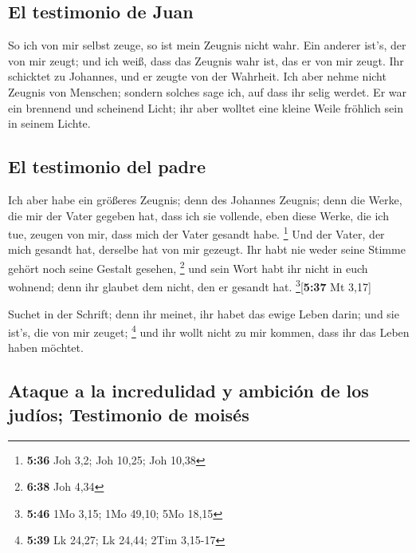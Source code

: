 \hypertarget{el-testimonio-de-juan}{%
\subsection{El testimonio de Juan}\label{el-testimonio-de-juan}}

 So ich von mir selbst zeuge, so ist mein Zeugnis nicht
wahr.  Ein anderer ist's, der von mir zeugt; und ich
weiß, dass das Zeugnis wahr ist, das er von mir zeugt. 
Ihr schicktet zu Johannes, und er zeugte von der Wahrheit.
 Ich aber nehme nicht Zeugnis von Menschen; sondern
solches sage ich, auf dass ihr selig werdet.  Er war ein
brennend und scheinend Licht; ihr aber wolltet eine kleine Weile
fröhlich sein in seinem Lichte.

\hypertarget{el-testimonio-del-padre}{%
\subsection{El testimonio del padre}\label{el-testimonio-del-padre}}

 Ich aber habe ein größeres Zeugnis; denn des Johannes
Zeugnis; denn die Werke, die mir der Vater gegeben hat, dass ich sie
vollende, eben diese Werke, die ich tue, zeugen von mir, dass mich der
Vater gesandt habe. \footnote{\textbf{5:36} Joh 3,2; Joh 10,25; Joh
  10,38}  Und der Vater, der mich gesandt hat, derselbe
hat von mir gezeugt. Ihr habt nie weder seine Stimme gehört noch seine
Gestalt gesehen, \footnote{\textbf{6:38} Joh 4,34}  und
sein Wort habt ihr nicht in euch wohnend; denn ihr glaubet dem nicht,
den er gesandt hat. \footnote{\textbf{5:46} 1Mo 3,15; 1Mo 49,10; 5Mo
  18,15}{[}\textbf{5:37} Mt 3,17{]}

 Suchet in der Schrift; denn ihr meinet, ihr habet das
ewige Leben darin; und sie ist's, die von mir zeuget; \footnote{\textbf{5:39}
  Lk 24,27; Lk 24,44; 2Tim 3,15-17}  und ihr wollt nicht
zu mir kommen, dass ihr das Leben haben möchtet.

\hypertarget{ataque-a-la-incredulidad-y-ambiciuxf3n-de-los-juduxedos-testimonio-de-moisuxe9s}{%
\subsection{Ataque a la incredulidad y ambición de los judíos;
Testimonio de
moisés}\label{ataque-a-la-incredulidad-y-ambiciuxf3n-de-los-juduxedos-testimonio-de-moisuxe9s}}

